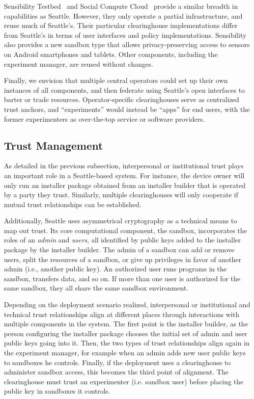 Sensibility Testbed~\cite{zhuang2014sensibility} and Social Compute
Cloud~\cite{caton2014social} provide a similar breadth in capabilities
as Seattle. However, they only operate a partial infrastructure, and
reuse much of Seattle's. Their particular clearinghouse
implementations differ from Seattle's in terms of user interfaces
and policy implementations. Sensibility also provides a new sandbox
type that allows privacy-preserving access to sensors on Android
smartphones and tablets. Other components, including the experiment
manager, are reused without changes.

Finally, we envision that multiple central operators
could set up their own instances of
all components, and then federate using Seattle's open interfaces
to barter or trade resources. %
Operator-specific clearinghouses serve as centralized trust
anchors, and ``experiments'' would instead be ``apps'' for
end users, with the former experimenters as over-the-top service or
software providers.



\subsection{Trust Management}\label{sec-trust}

As detailed in the previous subsection, interpersonal or
institutional trust plays an important role in a Seattle-based
system. For instance, the device owner will only run an
installer package obtained from an installer builder that is
operated by a party they trust. Similarly, multiple clearinghouses
will only cooperate if mutual trust relationships can be
established.

Additionally, Seattle uses asymmetrical cryptography as
a technical means to map out trust.
Its core computational component, the sandbox, incorporates the roles of
an \textit{admin}
and \textit{users}, all identified by
public keys added to the installer package by the
installer builder. The admin of a sandbox can add or remove
users, split the resources of a sandbox, or give up privileges
in favor of another admin (i.e., another public key).
An authorized user runs programs in the sandbox, transfers data,
and so on. If more than one user is authorized for the same
sandbox, they all share the same sandbox environment.

Depending on the deployment scenario realized, interpersonal
or institutional
and technical trust relationships align at different places
through interactions with multiple components in the system.
The first point is the installer builder, as the person configuring
the installer package chooses the initial set of admin and user public
keys going into it. Then, the two types of trust relationships align
again in the experiment manager, for example when an admin adds new user public
keys to sandboxes he controls. Finally, if the deployment uses a
clearinghouse to administer sandbox access, this becomes the
third point of alignment. The clearinghouse must trust an experimenter
(i.e. sandbox user) before placing the public key in sandboxes
it controls.

